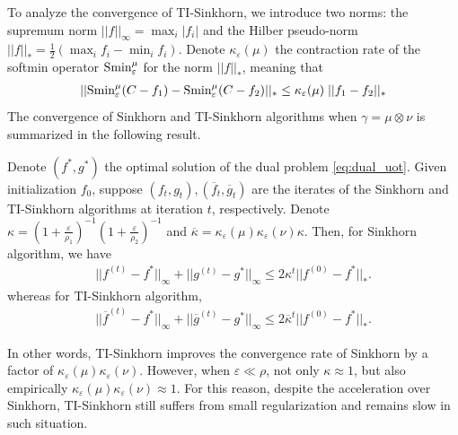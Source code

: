 To analyze the convergence of TI-Sinkhorn, we introduce two norms:
the supremum norm $||f||_{\infty} = \max_i | f_i|$ and the
Hilber pseudo-norm $||f||_* = \frac{1}{2} \left( \max_i f_i - \min_i f_i \right)$.
Denote $\kappa_{\varepsilon}(\mu)$ the contraction rate of the softmin operator
$\text{Smin}_{\varepsilon}^{\mu}$ for the norm $||f||_*$, meaning that
\begin{align}
  ||\text{Smin}_{\varepsilon}^{\mu}(C - f_1) - \text{Smin}_{\varepsilon}^{\mu}(C - f_2) ||_* \leq
  \kappa_{\varepsilon}(\mu) \; || f_1 - f_2 ||_*
\end{align}
The convergence of Sinkhorn and TI-Sinkhorn algorithms when $\gamma = \mu \otimes \nu$
is summarized in the following result.
\begin{proposition}
   Denote $(f^*, g^*)$ the optimal solution of
  the dual problem \ref{eq:dual_uot}. Given initialization $f_0$, suppose
  $(f_t, g_t), (\overline{f}_t, \overline{g}_t)$ are the iterates
  of the Sinkhorn and TI-Sinkhorn algorithms at iteration $t$, respectively. Denote
  $\kappa = \left( 1 + \frac{\varepsilon}{\rho_1} \right)^{-1} \left( 1 + \frac{\varepsilon}{\rho_2} \right)^{-1}$
  and $\overline{\kappa} = \kappa_{\varepsilon}(\mu) \kappa_{\varepsilon}(\nu) \kappa$. Then,
  for Sinkhorn algorithm, we have
  \begin{align}
    || f^{(t)} - f^* ||_{\infty} + || g^{(t)} - g^* ||_{\infty} \leq 2 \kappa^t || f^{(0)} - f^* ||_*.
  \end{align}
  whereas for TI-Sinkhorn algorithm,
  \begin{align}
    || \overline{f}^{(t)} - f^* ||_{\infty} + || \overline{g}^{(t)} - g^* ||_{\infty} \leq
    2 \overline{\kappa}^t || f^{(0)} - f^* ||_*.
  \end{align}
\end{proposition}
In other words, TI-Sinkhorn improves the convergence rate of Sinkhorn by a factor of
$\kappa_{\varepsilon}(\mu) \kappa_{\varepsilon}(\nu)$. However, when $\varepsilon \ll \rho$,
not only $\kappa \approx 1$, but also empirically
$\kappa_{\varepsilon}(\mu) \kappa_{\varepsilon}(\nu) \approx 1$.
For this reason, despite the acceleration over Sinkhorn,
TI-Sinkhorn still suffers from small regularization and remains slow in such situation.

